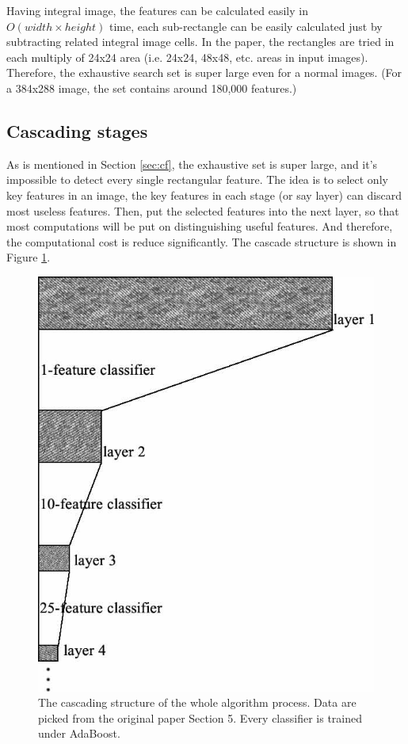\documentclass[10pt,twocolumn,letterpaper]{article}
\begin{document}
Having integral image, the features can be calculated easily in $O(width \times height)$ time,
each sub-rectangle can be easily calculated just by subtracting related integral image cells.
In the paper, the rectangles are tried in each multiply of 24x24 area (i.e. 24x24, 48x48, etc. areas in input images).
Therefore, the exhaustive search set is super large even for a normal images. (For a 384x288 image, the set contains around 180,000 features.)

\subsection{Cascading stages}
As is mentioned in Section \ref{sec:cf}, the exhaustive set is super large, and it's impossible to detect every single rectangular feature.
The idea is to select only key features in an image, the key features in each stage (or say layer) can discard most useless features.
Then, put the selected features into the next layer, so that most computations will be put on distinguishing useful features.
And therefore, the computational cost is reduce significantly. The cascade structure is shown in Figure \ref{fig:cs}.

\begin{figure}[t]
    \begin{center}
        \includegraphics[width=0.8\linewidth]{cascading}
    \end{center}
    \caption{The cascading structure of the whole algorithm process. Data are picked from the original paper Section 5. Every classifier is trained under AdaBoost.}
    \label{fig:cs}
\end{figure}
\end{document}
